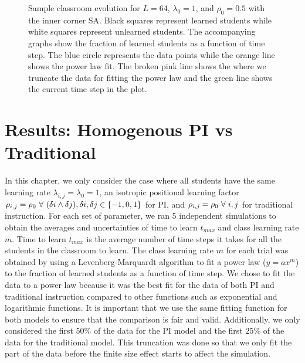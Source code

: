 \begin{figure}[htbp!]
    \caption[Example classroom evolution for the homogenous PI set up]{Sample classroom evolution for $L=64$, $\lambda_0 = 1$, and $\rho_0 = 0.5$ with the inner corner SA. 
    Black squares represent learned students while white squares represent unlearned students. 
    The accompanying graphs show the fraction of learned students as a function of time step. 
    The blue circle represents the data points while the orange line shows the power law fit. 
    The broken pink line shows the where we truncate the data for fitting the power law and the green line shows the current time step in the plot.}
    \label{fig:Sample classroom evolution}
 \end{figure}

\section{Results: Homogenous PI vs Traditional}
In this chapter, we only consider the case where all students have the same learning rate $\lambda_{i,j} = \lambda_0 = 1$,  an isotropic positional learning factor $\rho_{i,j} = \rho_0 \space ~\forall~ (\delta i \land \delta j),  \delta i, \delta j \in \lbrace -1,0,1 \rbrace $ for PI, and $\rho_{i,j}=\rho_0 \space ~\forall~ i,j$ for traditional instruction.
For each set of parameter, we ran 5 independent simulations to obtain the averages and uncertainties of time to learn $t_{max}$ and class learning rate $m$.
Time to learn $t_{max}$ is the average number of time steps it takes for all the students in the classroom to learn.
The class learning rate $m$ for each trial was obtained by using a Levenberg-Marquardt algorithm to fit a power law ($y = ax^m$) to the fraction of learned students as a function of time step.
We chose to fit the data to a power law because it was the best fit for the data of both PI and traditional instruction compared to other functions such as exponential and logarithmic functions.
It is important that we use the same fitting function for both models to ensure that the comparison is fair and valid.
Additionally, we only considered the first $50\%$ of the data for the PI model and the first $25\%$ of the data for the traditional model. 
This truncation was done so that we only fit the part of the data before the finite size effect starts to affect the simulation.

